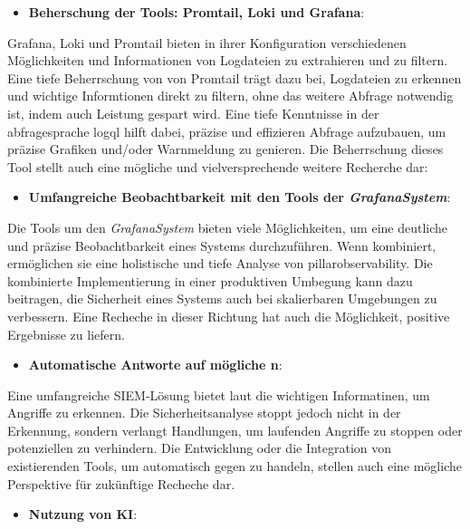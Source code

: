 \begin{itemize}[noitemsep]
    \item \textbf{Beherschung der Tools: Promtail, Loki und Grafana}:
\end{itemize}

Grafana, Loki und Promtail bieten in ihrer Konfiguration verschiedenen Möglichkeiten und Informationen von Logdateien zu extrahieren und zu filtern. Eine tiefe Beherrschung von  von Promtail trägt dazu bei, Logdateien zu erkennen und wichtige Informtionen direkt zu filtern, ohne das weitere Abfrage notwendig ist, indem auch Leistung gespart wird. Eine tiefe Kenntnisse in der \gls{abfragesprache} \gls{logql} hilft dabei, präzise und effizieren Abfrage aufzubauen, um präzise Grafiken und/oder Warnmeldung zu genieren. Die Beherrschung dieses Tool stellt auch eine mögliche und vielversprechende weitere Recherche dar:


\begin{itemize}[noitemsep]
    \item \textbf{Umfangreiche Beobachtbarkeit mit den Tools der \textit{\gls{GrafanaSystem}}}:
\end{itemize}

Die Tools um den \textit{\gls{GrafanaSystem}} bieten viele Möglichkeiten, um eine deutliche und präzise Beobachtbarkeit eines Systems durchzuführen. Wenn kombiniert, ermöglichen sie eine holistische und tiefe Analyse von \gls{pillarobservability}. Die kombinierte Implementierung in einer produktiven Umbegung kann dazu beitragen, die Sicherheit eines Systems auch bei skalierbaren Umgebungen zu verbessern. Eine Recheche in dieser Richtung hat auch die Möglichkeit, positive Ergebnisse zu liefern.


\begin{itemize}[noitemsep]
    \item \textbf{Automatische Antworte auf mögliche n}:
\end{itemize}

Eine umfangreiche \gls{SIEM}-Lösung bietet laut \cite{Mohammed_NOC} die wichtigen Informatinen, um Angriffe zu erkennen. Die Sicherheitsanalyse stoppt jedoch nicht in der Erkennung, sondern verlangt Handlungen, um laufenden Angriffe zu stoppen oder potenziellen zu verhindern. Die Entwicklung oder die Integration von existierenden Tools, um automatisch gegen  zu handeln, stellen auch eine mögliche Perspektive für zukünftige Recheche dar.

\begin{itemize}[noitemsep]
    \item \textbf{Nutzung von \gls{KI}}:
\end{itemize}

